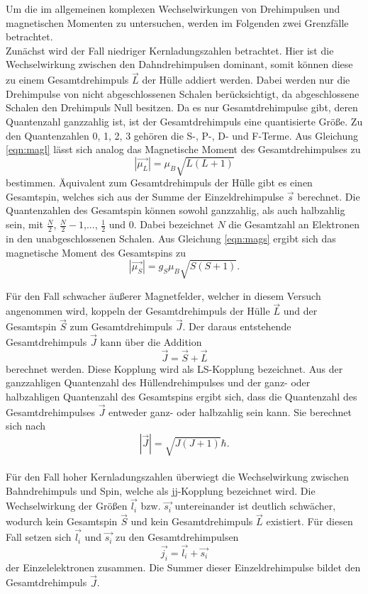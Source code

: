 Um die im allgemeinen komplexen Wechselwirkungen von Drehimpulsen und magnetischen Momenten
zu untersuchen, werden im Folgenden zwei Grenzfälle betrachtet.
\\
Zunächst wird der Fall niedriger Kernladungszahlen betrachtet.
Hier ist die Wechselwirkung zwischen den Dahndrehimpulsen dominant, somit können diese zu einem
Gesamtdrehimpuls $\vec{L}$ der Hülle addiert werden. Dabei werden nur die Drehimpulse von
nicht abgeschlossenen Schalen berücksichtigt, da abgeschlossene Schalen den Drehimpuls  Null
besitzen. Da es nur Gesamtdrehimpulse gibt, deren Quantenzahl ganzzahlig ist, ist der
Gesamtdrehimpuls eine quantisierte Größe. Zu den Quantenzahlen 0, 1, 2, 3 gehören die
S-, P-, D- und F-Terme.
Aus Gleichung \ref{eqn:magl} lässt sich analog das Magnetische Moment des Gesamtdrehimpulses zu
\begin{equation}
  |\vec{\mu_{L}}|=\mu_B \sqrt{L(L+1)}
\end{equation}
bestimmen.
Äquivalent zum Gesamtdrehimpuls der Hülle gibt es einen Gesamtspin, welches sich aus der
Summe der Einzeldrehimpulse $\vec{s}$ berechnet. Die Quantenzahlen des Gesamtspin können
sowohl ganzzahlig, als auch halbzahlig sein, mit
$\frac{N}{2}$, $\frac{N}{2} -1$,..., $\frac{1}{2}$ und 0. Dabei bezeichnet $N$ die
Gesamtzahl an Elektronen in den unabgeschlossenen Schalen.
Aus Gleichung \ref{eqn:mags} ergibt sich das magnetische Moment des Gesamtspins zu
\begin{equation}
  |\vec{\mu_S}|=g_S\mu_B \sqrt{S(S+1)}.
\end{equation}

Für den Fall schwacher äußerer Magnetfelder, welcher in diesem Versuch angenommen wird, koppeln
der Gesamtdrehimpuls der Hülle $\vec{L}$ und der Gesamtspin $\vec{S}$ zum Gesamtdrehimpuls $\vec{J}$.
Der daraus entstehende Gesamtdrehimpuls $\vec{J}$ kann über die Addition
\begin{equation}
  \vec{J}=\vec{S}+\vec{L}
\end{equation}
berechnet werden. Diese Kopplung wird als LS-Kopplung bezeichnet. Aus der ganzzahligen Quantenzahl des Hüllendrehimpulses und der
ganz- oder halbzahligen Quantenzahl des Gesamtspins ergibt sich, dass die
Quantenzahl des Gesamtdrehimpulses $\vec{J}$ entweder ganz- oder halbzahlig sein kann.
Sie berechnet sich nach
\begin{equation}
  |\vec{J}|=\sqrt{J(J+1)}\hbar.
\end{equation}
\\
Für den Fall hoher Kernladungszahlen überwiegt die Wechselwirkung zwischen
Bahndrehimpuls und Spin, welche als jj-Kopplung bezeichnet wird.
Die Wechselwirkung der Größen $\vec{l_i}$ bzw. $\vec{s_i}$ untereinander ist deutlich
schwächer, wodurch kein Gesamtspin $\vec{S}$ und kein Gesamtdrehimpuls $\vec{L}$ existiert.
Für diesen Fall setzen sich $\vec{l_i}$ und $\vec{s_i}$ zu den Gesamtdrehimpulsen
\begin{equation}
  \vec{j_i}=\vec{l_i} +\vec{s_i}
\end{equation}
der Einzelelektronen zusammen. Die Summer dieser Einzeldrehimpulse bildet
den Gesamtdrehimpuls $\vec{J}$.

